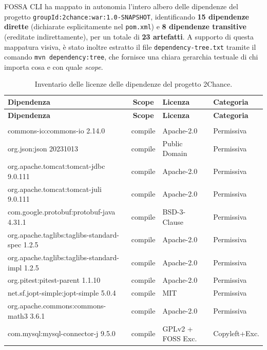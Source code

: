 FOSSA CLI ha mappato in autonomia l'intero albero delle dipendenze del progetto \texttt{groupId:2chance:war:1.0-SNAPSHOT}, identificando \textbf{15 dipendenze dirette} (dichiarate esplicitamente nel \texttt{pom.xml}) e \textbf{8 dipendenze transitive} (ereditate indirettamente), per un totale di \textbf{23 artefatti}. A supporto di questa mappatura visiva, è stato inoltre estratto il file \texttt{dependency-tree.txt} tramite il comando \texttt{mvn dependency:tree}, che fornisce una chiara gerarchia testuale di chi importa cosa e con quale \textit{scope}.

\begin{longtable}{>{\ttfamily\footnotesize}p{4.8cm} c >{\footnotesize}p{4.2cm} l}
\caption{Inventario delle licenze delle dipendenze del progetto 2Chance.} \label{tab:license_inventory} \\
\toprule
\normalfont\textbf{Dipendenza} & \textbf{Scope} & \textbf{Licenza} & \textbf{Categoria} \\
\midrule
\endfirsthead
\toprule
\normalfont\textbf{Dipendenza} & \textbf{Scope} & \textbf{Licenza} & \textbf{Categoria} \\
\midrule
\endhead
\midrule
\multicolumn{4}{r}{\footnotesize\textit{Continua nella pagina successiva}} \\
\endfoot
\bottomrule
\endlastfoot
commons-io:commons-io 2.14.0 & compile & Apache-2.0 & Permissiva \\
org.json:json 20231013 & compile & Public Domain & Permissiva \\
org.apache.tomcat:tomcat-jdbc 9.0.111 & compile & Apache-2.0 & Permissiva \\
org.apache.tomcat:tomcat-juli 9.0.111 & compile & Apache-2.0 & Permissiva \\
com.google.protobuf:protobuf-java 4.31.1 & compile & BSD-3-Clause & Permissiva \\
org.apache.taglibs:taglibs-standard-spec 1.2.5 & compile & Apache-2.0 & Permissiva \\
org.apache.taglibs:taglibs-standard-impl 1.2.5 & compile & Apache-2.0 & Permissiva \\
org.pitest:pitest-parent 1.1.10 & compile & Apache-2.0 & Permissiva \\
net.sf.jopt-simple:jopt-simple 5.0.4 & compile & MIT & Permissiva \\
org.apache.commons:commons-math3 3.6.1 & compile & Apache-2.0 & Permissiva \\
\rowcolor{yellow!15}
com.mysql:mysql-connector-j 9.5.0 & compile & GPLv2 + FOSS Exc. & Copyleft+Exc. \\

\end{longtable}
